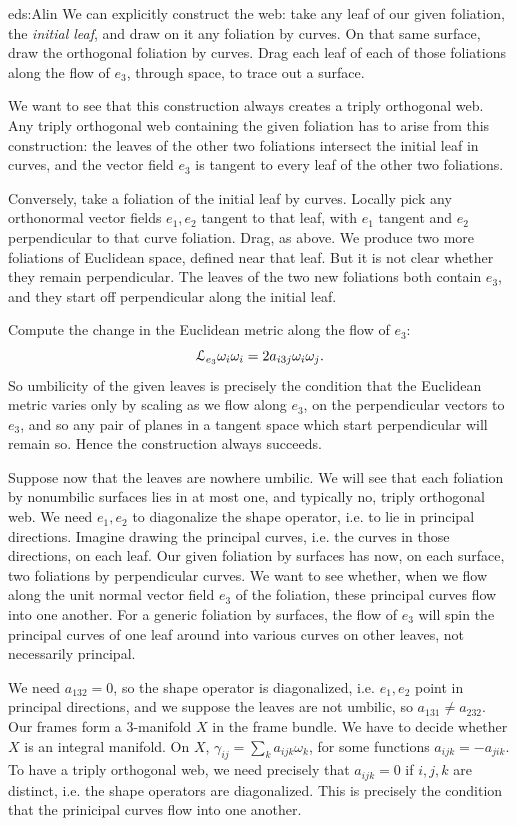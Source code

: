 \begin{answer}{eds:Alin}
We can explicitly construct the web: take any leaf of our given foliation, the \emph{initial leaf}, and draw on it any foliation by curves.
On that same surface, draw the orthogonal foliation by curves.
Drag each leaf of each of those foliations along the flow of \(e_3\), through space, to trace out a surface.

We want to see that this construction always creates a triply orthogonal web.
Any triply orthogonal web containing the given foliation has to arise from this construction: the leaves of the other two foliations intersect the initial leaf in curves, and the vector field \(e_3\) is tangent to every leaf of the other two foliations.

Conversely, take a foliation of the initial leaf by curves.
Locally pick any orthonormal vector fields \(e_1,e_2\) tangent to that leaf, with \(e_1\) tangent and \(e_2\) perpendicular to that curve foliation.
Drag, as above.
We produce two more foliations of Euclidean space, defined near that leaf.
But it is not clear whether they remain perpendicular.
The leaves of the two new foliations both contain \(e_3\), and they start off perpendicular along the initial leaf.

Compute the change in the Euclidean metric along the flow of \(e_3\):
\[
\EuScript L_{e_3} \omega_i\omega_i
=2a_{i3j}\omega_i\omega_j.
\]
So umbilicity of the given leaves is precisely the condition that the Euclidean metric varies only by scaling as we flow along \(e_3\), on the perpendicular vectors to \(e_3\), and so any pair of planes in a tangent space which start perpendicular will remain so.
Hence the construction always succeeds.

Suppose now that the leaves are nowhere umbilic.
We will see that each foliation by nonumbilic surfaces lies in at most one, and typically no, triply orthogonal web.
We need \(e_1,e_2\) to diagonalize the shape operator, i.e. to lie in principal directions.
Imagine drawing the principal curves, i.e. the curves in those directions, on each leaf.
Our given foliation by surfaces has now, on each surface, two foliations by perpendicular curves.
We want to see whether, when we flow along the unit normal vector field \(e_3\) of the foliation, these principal curves flow into one another.
For a generic foliation by surfaces, the flow of \(e_3\) will spin the principal curves of one leaf around into various curves on other leaves, not necessarily principal.

We need \(a_{132}=0\), so the shape operator is diagonalized, i.e. \(e_1,e_2\) point in principal directions, and we suppose the leaves are not umbilic, so \(a_{131}\ne a_{232}\).
Our frames form a \(3\)-manifold \(X\) in the frame bundle.
We have to decide whether \(X\) is an integral manifold.
On \(X\), \(\gamma_{ij}=\sum_k a_{ijk}\omega_k\), for some functions \(a_{ijk}=-a_{jik}\).
To have a triply orthogonal web, we need precisely that \(a_{ijk}=0\) if \(i,j,k\) are distinct, i.e. the shape operators are diagonalized.
This is precisely the condition that the prinicipal curves flow into one another.
\end{answer}


